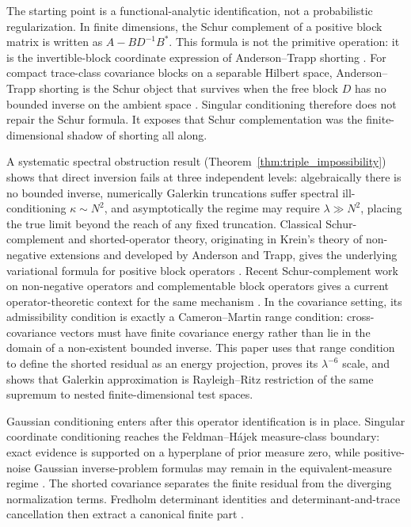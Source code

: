 \documentclass[preprint,12pt]{elsarticle}
\theoremstyle{plain}
\theoremstyle{definition}
\theoremstyle{remark}
\begin{document}
    The starting point is a functional-analytic identification, not a
    probabilistic regularization.  In finite dimensions, the Schur complement
    of a positive block matrix is written as $A-BD^{-1}B^*$.  This formula is
    not the primitive operation: it is the invertible-block coordinate
    expression of Anderson--Trapp shorting
    \cite{krein1947selfadjoint,anderson1975shorted,douglas1966majorization,hassi2023complementation}.
    For compact trace-class covariance
    blocks on a separable Hilbert space, Anderson--Trapp shorting is the Schur
    object that survives when the free block $D$ has no bounded inverse on the
    ambient space
    \cite{bogachev1998gaussian,simon2005trace,daprato2014stochastic,jorgensentian2024hilbert}.  Singular
    conditioning therefore does not repair the Schur formula.  It exposes that
    Schur complementation was the finite-dimensional shadow of shorting all
    along.

    A systematic spectral obstruction result
    (Theorem~\ref{thm:triple_impossibility}) shows that direct inversion fails
    at three independent levels: algebraically there is no bounded inverse,
    numerically Galerkin truncations suffer spectral ill-conditioning
    $\kappa\sim N^{2}$, and asymptotically the regime may require
    $\lambda\gg N^{2}$, placing the true limit beyond the reach of any fixed
    truncation.  Classical Schur-complement and shorted-operator theory,
    originating in Krein's theory of non-negative extensions and developed by
    Anderson and Trapp, gives the underlying variational formula for positive
    block operators
    \cite{krein1947selfadjoint,anderson1975shorted,douglas1966majorization,hassi2023complementation}.
    Recent Schur-complement work on non-negative operators and complementable
    block operators gives a current operator-theoretic context for the same
    mechanism \cite{contino2021matrix,naikjohnson2024complementable}.
    In the covariance setting, its admissibility condition is exactly a
    Cameron--Martin range condition: cross-covariance vectors must have finite
    covariance energy rather than lie in the domain of a non-existent bounded
    inverse.  This paper uses that range condition to define the shorted
    residual as an energy projection, proves its $\lambda^{-6}$ scale, and
    shows that Galerkin approximation is Rayleigh--Ritz restriction of the same
    supremum to nested finite-dimensional test spaces.

    Gaussian conditioning enters after this operator identification is in
    place.  Singular coordinate conditioning reaches the Feldman--H\'{a}jek
    measure-class boundary: exact evidence is supported on a hyperplane of
    prior measure zero, while positive-noise Gaussian inverse-problem formulas may remain in
    the equivalent-measure regime
    \cite{cameron1944transformations,feldman1958equivalence,hajek1958property,bogachev1998gaussian,stuart2010inverse,carerelie2024covariance,carerelie2025mean}.
    The shorted covariance separates the finite residual from the diverging
    normalization terms.  Fredholm determinant identities and
    determinant-and-trace cancellation then extract a canonical finite part
    \cite{simon2005trace,gohberg2000traces}.
\end{document}

